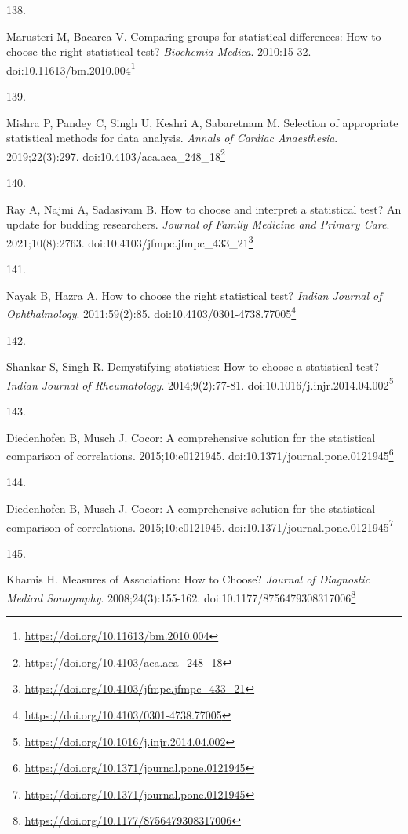 \documentclass[
  a4paper,
]{book}
\newlength{\cslhangindent}
\newlength{\csllabelwidth}
\newlength{\cslentryspacingunit} %
\newenvironment{CSLReferences}[2] %
 {%
  \setlength{\parindent}{0pt}
  \ifodd #1
  \let\oldpar\par
  \def\par{\hangindent=\cslhangindent\oldpar}
  \fi
  \setlength{\parskip}{#2\cslentryspacingunit}
 }%
 {}
\newcommand{\CSLLeftMargin}[1]{\parbox[t]{\csllabelwidth}{#1}}
\newcommand{\CSLRightInline}[1]{\parbox[t]{\linewidth - \csllabelwidth}{#1}\break}
\renewcommand{\href}[2]{#2\footnote{\url{#1}}}
\begin{document}
\begin{CSLReferences}{0}{0}
\leavevmode{}%
\CSLLeftMargin{138. }%
\CSLRightInline{Marusteri M, Bacarea V. Comparing groups for statistical differences: How to choose the right statistical test? \emph{Biochemia Medica}. 2010:15-32. doi:\href{https://doi.org/10.11613/bm.2010.004}{10.11613/bm.2010.004}}

\leavevmode{}%
\CSLLeftMargin{139. }%
\CSLRightInline{Mishra P, Pandey C, Singh U, Keshri A, Sabaretnam M. Selection of appropriate statistical methods for data analysis. \emph{Annals of Cardiac Anaesthesia}. 2019;22(3):297. doi:\href{https://doi.org/10.4103/aca.aca_248_18}{10.4103/aca.aca\_248\_18}}

\leavevmode{}%
\CSLLeftMargin{140. }%
\CSLRightInline{Ray A, Najmi A, Sadasivam B. How to choose and interpret a statistical test? An update for budding researchers. \emph{Journal of Family Medicine and Primary Care}. 2021;10(8):2763. doi:\href{https://doi.org/10.4103/jfmpc.jfmpc_433_21}{10.4103/jfmpc.jfmpc\_433\_21}}

\leavevmode{}%
\CSLLeftMargin{141. }%
\CSLRightInline{Nayak B, Hazra A. How to choose the right statistical test? \emph{Indian Journal of Ophthalmology}. 2011;59(2):85. doi:\href{https://doi.org/10.4103/0301-4738.77005}{10.4103/0301-4738.77005}}

\leavevmode{}%
\CSLLeftMargin{142. }%
\CSLRightInline{Shankar S, Singh R. Demystifying statistics: How to choose a statistical test? \emph{Indian Journal of Rheumatology}. 2014;9(2):77-81. doi:\href{https://doi.org/10.1016/j.injr.2014.04.002}{10.1016/j.injr.2014.04.002}}

\leavevmode{}%
\CSLLeftMargin{143. }%
\CSLRightInline{Diedenhofen B, Musch J. Cocor: A comprehensive solution for the statistical comparison of correlations. 2015;10:e0121945. doi:\href{https://doi.org/10.1371/journal.pone.0121945}{10.1371/journal.pone.0121945}}

\leavevmode{}%
\CSLLeftMargin{144. }%
\CSLRightInline{Diedenhofen B, Musch J. Cocor: A comprehensive solution for the statistical comparison of correlations. 2015;10:e0121945. doi:\href{https://doi.org/10.1371/journal.pone.0121945}{10.1371/journal.pone.0121945}}

\leavevmode{}%
\CSLLeftMargin{145. }%
\CSLRightInline{Khamis H. Measures of Association: How to Choose? \emph{Journal of Diagnostic Medical Sonography}. 2008;24(3):155-162. doi:\href{https://doi.org/10.1177/8756479308317006}{10.1177/8756479308317006}}


\end{CSLReferences}
\end{document}
